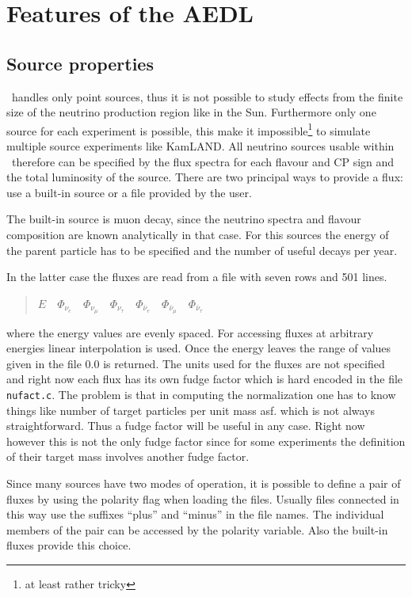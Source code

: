\chapter{Features of the  AEDL}

\section{Source properties}
\label{sec:source}

\GLOBES\ handles only point sources, thus it is not possible
to study effects from the finite size of the neutrino production
region like in the Sun. Furthermore only one source for each experiment
is possible, this make it impossible\footnote{at least rather tricky} 
to simulate multiple source experiments like KamLAND. All neutrino
sources usable within \GLOBES\ therefore can be specified by the
flux spectra for each flavour and CP sign and the total luminosity
of the source. There are two principal ways to provide a flux:
use a built-in source or a file provided by the user. 

The built-in source is muon decay, since the neutrino
spectra and flavour composition are known analytically in that case. For 
this sources the energy of the parent particle has to be specified
and the number of useful decays per year.

In the latter case the fluxes are read from a file with seven rows and
501 lines.
\begin{quotation}
$ E\quad
\Phi_{\nu_e}\quad
\Phi_{\nu_\mu}\quad
\Phi_{\nu_\tau}\quad
\Phi_{\bar\nu_e}\quad
\Phi_{\bar\nu_\mu}\quad
\Phi_{\bar\nu_\tau}$
\end{quotation}
where the energy values are evenly spaced. 
For accessing fluxes at 
arbitrary energies linear interpolation is used. Once the energy leaves the
range of values given in the file $0.0$ is returned. The units used for the
fluxes are not specified and right now each flux has its own fudge factor
which is hard encoded in the file {\tt nufact.c}. The problem is that
in computing the normalization one has to know things like number of target
particles per unit mass asf. which is not always straightforward. Thus a fudge
factor will be useful in any case. Right now however this is not the only 
fudge factor since for some experiments the definition of their target mass
involves another fudge factor. 

Since many sources have two modes of operation, it is possible to define
a pair of fluxes by using the polarity flag when loading the files. Usually
files connected in this way use the suffixes ``plus'' and ``minus'' in the 
file names. The individual members of the pair can be accessed by the polarity
variable. Also the built-in fluxes provide this choice.


